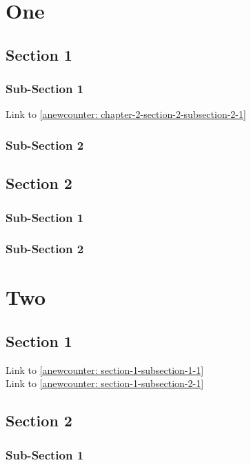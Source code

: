 \documentclass{report}
\newcounter{aNewCounter}[subsection] %
\begin{document}
	\chapter{One}
	\section{Section 1}
	\subsection{Sub-Section 1}
	Link to \ref{anewcounter: chapter-2-section-2-subsection-2-1}
	\newpage
	\subsection{Sub-Section 2}
	\newpage
	
	\section{Section 2}
	\subsection{Sub-Section 1}
	\subsection{Sub-Section 2}
	\newpage
	\chapter{Two}
	\section{Section 1}
	Link to \ref{anewcounter: section-1-subsection-1-1} \\
	Link to \ref{anewcounter: section-1-subsection-2-1}
	\section{Section 2}
	\subsection{Sub-Section 1}
\end{document}
